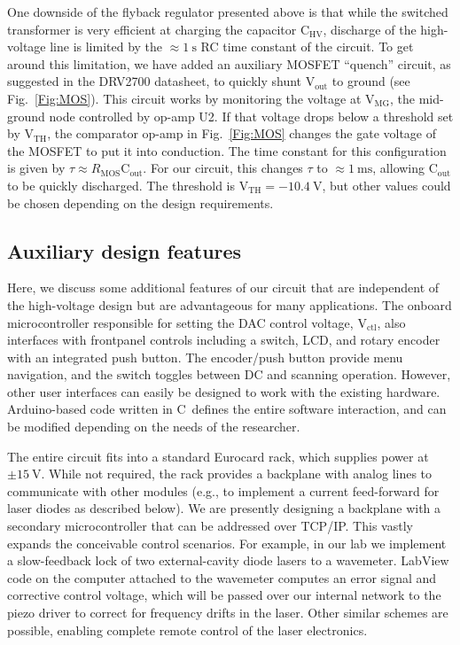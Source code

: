 \documentclass[aip,rsi,reprint]{revtex4-1} %
\newcommand{\CC}{{C\nolinebreak[4]\hspace{-.05em}\raisebox{.4ex}{\tiny\bf ++}}~}
\begin{document}
One downside of the flyback regulator presented above is that while the switched transformer is very efficient at charging the capacitor $\text{C}_\text{HV}$, discharge of the high-voltage line is limited by the $\approx\SI{1}{\second}$ RC time constant of the circuit.
To get around this limitation, we have added an auxiliary MOSFET ``quench'' circuit, as suggested in the DRV2700 datasheet, to quickly shunt $\text{V}_\text{out}$ to ground (see Fig.~\ref{Fig:MOS}).
This circuit works by monitoring the voltage at $\text{V}_\text{MG}$, the mid-ground node controlled by op-amp U2.
If that voltage drops below a threshold set by $\text{V}_\text{TH}$, the comparator op-amp in Fig.~\ref{Fig:MOS} changes the gate voltage of the MOSFET to put it into conduction.
The time constant for this configuration is given by $\tau \approx R_\text{MOS}\text{C}_\text{out}$. For our circuit, this changes $\tau$ to $\approx\SI{1}{\milli\second}$, allowing $\text{C}_\text{out}$ to be quickly discharged.
The threshold is $\text{V}_\text{TH} = \SI{-10.4}{\volt}$, but other values could be chosen depending on the design requirements.



\subsection{Auxiliary design features}
\label{Sec:AuxDesign}

Here, we discuss some additional features of our circuit that are independent of the high-voltage design but are advantageous for many applications.
The onboard microcontroller responsible for setting the DAC control voltage, $\text{V}_\text{ctl}$, also interfaces with frontpanel controls including a switch, LCD, and rotary encoder with an integrated push button.
The encoder/push button provide menu navigation, and the switch toggles between DC and scanning operation.
However, other user interfaces can easily be designed to work with the existing hardware.
Arduino-based code written in \CC defines the entire software interaction, and can be modified depending on the needs of the researcher.

The entire circuit fits into a standard Eurocard rack, which supplies power at $\pm\SI{15}{\volt}$.
While not required, the rack provides a backplane with analog lines to communicate with other modules (e.g., to implement a current feed-forward for laser diodes as described below).
We are presently designing a backplane with a secondary microcontroller that can be addressed over TCP/IP.
This vastly expands the conceivable control scenarios. 
For example, in our lab we implement a slow-feedback lock of two external-cavity diode lasers to a wavemeter.
LabView code on the computer attached to the wavemeter computes an error signal and corrective control voltage, which will be passed over our internal network to the piezo driver to correct for frequency drifts in the laser.
Other similar schemes are possible, enabling complete remote control of the laser electronics.
\end{document}
